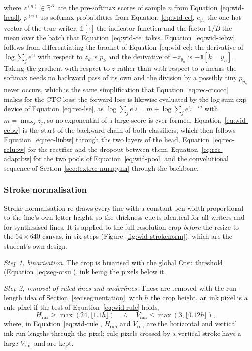 where $z^{(n)}\in\mathbb R^{K}$ are the pre-softmax scores of sample $n$ from Equation~\ref{eq:wid-head}, $p^{(n)}$ its softmax probabilities from Equation~\ref{eq:wid-ce}, $e_{y_n}$ the one-hot vector of the true writer, $\mathbb 1[\cdot]$ the indicator function and the factor $1/B$ the mean over the batch that Equation~\ref{eq:wid-ce} takes.
Equation~\ref{eq:wid-cebw} follows from differentiating the bracket of Equation~\ref{eq:wid-ce}: the derivative of $\log\sum_je^{z_j}$ with respect to $z_k$ is $p_k$ and the derivative of $-z_{y_n}$ is $-\mathbb 1[k=y_n]$.
Taking the gradient with respect to $z$ rather than with respect to $p$ means the softmax needs no backward pass of its own and the division by a possibly tiny $p_{y_n}$ never occurs, which is the same simplification that Equation~\ref{eq:rec-ctcocc} makes for the CTC loss; the forward loss is likewise evaluated by the log-sum-exp device of Equation~\ref{eq:rec-lse}, as $\log\sum_je^{z_j}=m+\log\sum_je^{z_j-m}$ with $m=\max_jz_j$, so no exponential of a large score is ever formed.
Equation~\ref{eq:wid-cebw} is the start of the backward chain of both classifiers, which then follows Equation~\ref{eq:rec-linbw} through the two layers of the head, Equation~\ref{eq:rec-relubw} for the rectifier and the dropout between them, Equation~\ref{eq:rec-adaptbw} for the two pools of Equation~\ref{eq:wid-pool} and the convolutional sequence of Section~\ref{sec:textrec-numpynn} through the backbone.

\subsubsection{Stroke normalisation}
\label{sec:wid-strokenorm}

Stroke normalisation re-draws every line with a constant pen width proportional to the line's own letter height, so the thickness cue is identical for all writers and for synthesised lines.
It is applied to the full-resolution crop \emph{before} the resize to the $64\times640$ canvas, in six steps (Figure~\ref{fig:wid-strokenorm}), which are the student's own design.

\emph{Step 1, binarisation.} The crop is binarised with the global Otsu threshold (Equation~\ref{eq:seg-otsu}), ink being the pixels below it.

\emph{Step 2, removal of ruled lines and underlines.} These are removed with the run-length idea of Section~\ref{sec:segmentation}: with $h$ the crop height, an ink pixel is a rule pixel if the test of Equation~\ref{eq:wid-rule} holds,
\begin{equation}
H_{\mathrm{run}}\ge\max(24,\lfloor1.1h\rfloor)\quad\wedge\quad V_{\mathrm{run}}\le\max(3,\lfloor0.12h\rfloor),
\label{eq:wid-rule}
\end{equation}
where, in Equation~\ref{eq:wid-rule}, $H_{\mathrm{run}}$ and $V_{\mathrm{run}}$ are the horizontal and vertical ink-run lengths through the pixel; rule pixels crossed by a vertical stroke have a large $V_{\mathrm{run}}$ and are kept.

